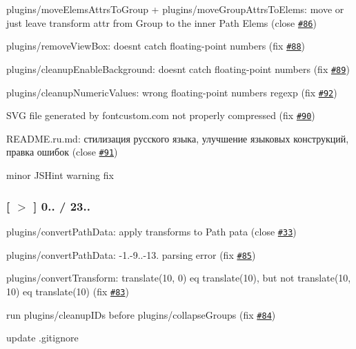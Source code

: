 \begin{DoxyItemize}
\item plugins/move\+Elems\+Attrs\+To\+Group + plugins/move\+Group\+Attrs\+To\+Elems\+: move or just leave transform attr from Group to the inner Path Elems (close \href{https://github.com/svg/svgo/issues/86}{\tt \#86})
\item plugins/remove\+View\+Box\+: doesn\textquotesingle{}t catch floating-\/point numbers (fix \href{https://github.com/svg/svgo/issues/88}{\tt \#88})
\item plugins/cleanup\+Enable\+Background\+: doesn\textquotesingle{}t catch floating-\/point numbers (fix \href{https://github.com/svg/svgo/issues/89}{\tt \#89})
\item plugins/cleanup\+Numeric\+Values\+: wrong floating-\/point numbers regexp (fix \href{https://github.com/svg/svgo/issues/92}{\tt \#92})
\item S\+VG file generated by fontcustom.\+com not properly compressed (fix \href{https://github.com/svg/svgo/issues/90}{\tt \#90})
\item {\ttfamily R\+E\+A\+D\+M\+E.\+ru.\+md}\+: стилизация русского языка, улучшение языковых конструкций, правка ошибок (close \href{https://github.com/svg/svgo/issues/91}{\tt \#91})
\item minor J\+S\+Hint warning fix
\end{DoxyItemize}

\subsubsection*{\mbox{[} \href{https://github.com/svg/svgo/tree/v0.2.0}{\tt $>$} \mbox{]} 0.. / 23..}


\begin{DoxyItemize}
\item plugins/convert\+Path\+Data\+: apply transforms to Path pata (close \href{https://github.com/svg/svgo/issues/33}{\tt \#33})
\item plugins/convert\+Path\+Data\+: {\ttfamily -\/1.-\/9..-\/13.} parsing error (fix \href{https://github.com/svg/svgo/issues/85}{\tt \#85})
\item plugins/convert\+Transform\+: {\ttfamily translate(10, 0)} eq {\ttfamily translate(10)}, but not {\ttfamily translate(10, 10)} eq {\ttfamily translate(10)} (fix \href{https://github.com/svg/svgo/issues/83}{\tt \#83})
\item run plugins/cleanup\+I\+Ds before plugins/collapse\+Groups (fix \href{https://github.com/svg/svgo/issues/84}{\tt \#84})
\item update {\ttfamily .gitignore}
\end{DoxyItemize}

